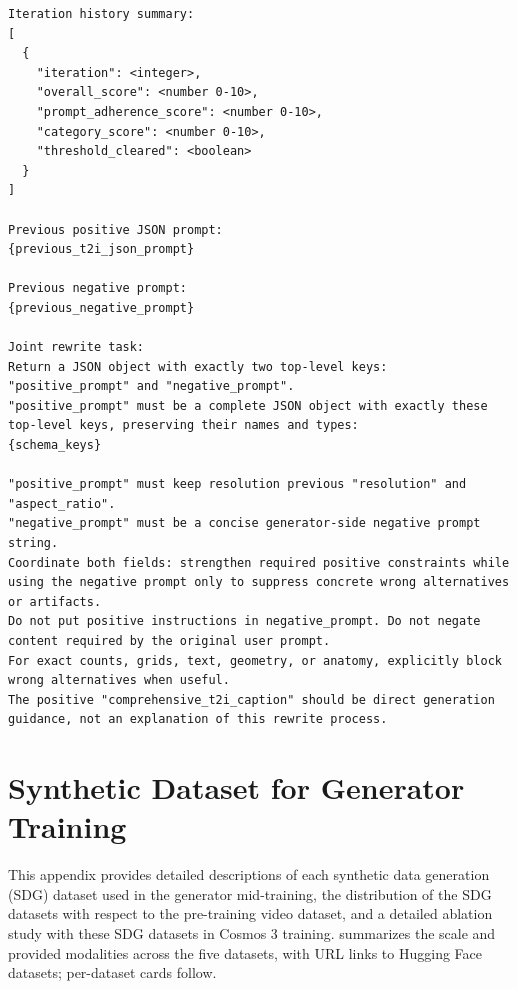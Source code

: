 \documentclass{llmxive}
\begin{document}
\begin{tcolorbox}
\begin{Verbatim}[breaklines=true,breakanywhere=true,fontsize=\scriptsize]
Iteration history summary:
[
  {
    "iteration": <integer>,
    "overall_score": <number 0-10>,
    "prompt_adherence_score": <number 0-10>,
    "category_score": <number 0-10>,
    "threshold_cleared": <boolean>
  }
]

Previous positive JSON prompt:
{previous_t2i_json_prompt}

Previous negative prompt:
{previous_negative_prompt}

Joint rewrite task:
Return a JSON object with exactly two top-level keys: "positive_prompt" and "negative_prompt".
"positive_prompt" must be a complete JSON object with exactly these top-level keys, preserving their names and types:
{schema_keys}

"positive_prompt" must keep resolution previous "resolution" and "aspect_ratio".
"negative_prompt" must be a concise generator-side negative prompt string.
Coordinate both fields: strengthen required positive constraints while using the negative prompt only to suppress concrete wrong alternatives or artifacts.
Do not put positive instructions in negative_prompt. Do not negate content required by the original user prompt.
For exact counts, grids, text, geometry, or anatomy, explicitly block wrong alternatives when useful.
The positive "comprehensive_t2i_caption" should be direct generation guidance, not an explanation of this rewrite process.
\end{Verbatim}
\end{tcolorbox}

\section{Synthetic Dataset for Generator Training}
\label{appendix:sdg_datasets}

This appendix provides detailed descriptions of each synthetic data generation (SDG) dataset used in the generator mid-training, the distribution of the SDG datasets with respect to the pre-training video dataset, and a detailed ablation study with these SDG datasets in Cosmos 3 training.  summarizes the scale and provided modalities across the five datasets, with URL links to Hugging Face datasets; per-dataset cards follow.
\end{document}
